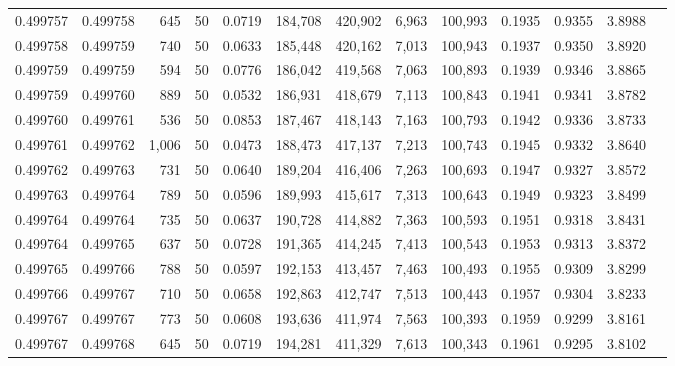 \begin{tabular}{rrrrrrrrrrrrr}
0.499757 & 0.499758 &   645 &  50 &                                     0.0719 & 184,708 & 420,902 &   6,963 & 100,993 & 0.1935 & 0.9355 & 3.8988 \\
0.499758 & 0.499759 &   740 &  50 &                                     0.0633 & 185,448 & 420,162 &   7,013 & 100,943 & 0.1937 & 0.9350 & 3.8920 \\
0.499759 & 0.499759 &   594 &  50 &                                     0.0776 & 186,042 & 419,568 &   7,063 & 100,893 & 0.1939 & 0.9346 & 3.8865 \\
0.499759 & 0.499760 &   889 &  50 &                                     0.0532 & 186,931 & 418,679 &   7,113 & 100,843 & 0.1941 & 0.9341 & 3.8782 \\
0.499760 & 0.499761 &   536 &  50 &                                     0.0853 & 187,467 & 418,143 &   7,163 & 100,793 & 0.1942 & 0.9336 & 3.8733 \\
0.499761 & 0.499762 & 1,006 &  50 &                                     0.0473 & 188,473 & 417,137 &   7,213 & 100,743 & 0.1945 & 0.9332 & 3.8640 \\
0.499762 & 0.499763 &   731 &  50 &                                     0.0640 & 189,204 & 416,406 &   7,263 & 100,693 & 0.1947 & 0.9327 & 3.8572 \\
0.499763 & 0.499764 &   789 &  50 &                                     0.0596 & 189,993 & 415,617 &   7,313 & 100,643 & 0.1949 & 0.9323 & 3.8499 \\
0.499764 & 0.499764 &   735 &  50 &                                     0.0637 & 190,728 & 414,882 &   7,363 & 100,593 & 0.1951 & 0.9318 & 3.8431 \\
0.499764 & 0.499765 &   637 &  50 &                                     0.0728 & 191,365 & 414,245 &   7,413 & 100,543 & 0.1953 & 0.9313 & 3.8372 \\
0.499765 & 0.499766 &   788 &  50 &                                     0.0597 & 192,153 & 413,457 &   7,463 & 100,493 & 0.1955 & 0.9309 & 3.8299 \\
0.499766 & 0.499767 &   710 &  50 &                                     0.0658 & 192,863 & 412,747 &   7,513 & 100,443 & 0.1957 & 0.9304 & 3.8233 \\
0.499767 & 0.499767 &   773 &  50 &                                     0.0608 & 193,636 & 411,974 &   7,563 & 100,393 & 0.1959 & 0.9299 & 3.8161 \\
0.499767 & 0.499768 &   645 &  50 &                                     0.0719 & 194,281 & 411,329 &   7,613 & 100,343 & 0.1961 & 0.9295 & 3.8102 \\

\end{tabular}
